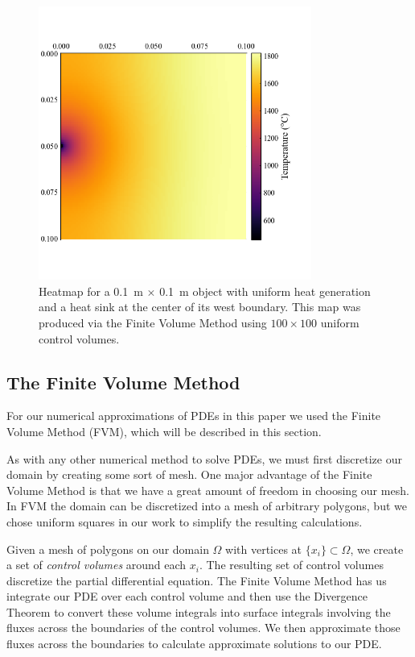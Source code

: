 \begin{figure}
	\centering
	\includegraphics[width=0.8\textwidth]{Chapter_I_Background/Images/Heatmap_Example.png}
	\caption[Heatmap Example]{Heatmap for a \SI{0.1}{\meter} $\times$ \SI{0.1}{\meter} object with uniform heat generation and a heat sink at the center of its west boundary. This map was produced via the Finite Volume Method using $100\times 100$ uniform control volumes.}
	\label{fig:heatmap-example}
\end{figure}

\subsection{The Finite Volume Method}

For our numerical approximations of PDEs in this paper we used the Finite Volume Method (FVM), which will be described in this section.

As with any other numerical method to solve PDEs, we must first discretize our domain by creating some sort of mesh. One major advantage of the Finite Volume Method is that we have a great amount of freedom in choosing our mesh. In FVM the domain can be discretized into a mesh of arbitrary polygons, but we chose uniform squares in our work to simplify the resulting calculations.

Given a mesh of polygons on our domain $\Omega$ with vertices at $\lbrace x_i\rbrace\subset\Omega$, we create a set of {\color{baystate}\textit{control volumes}} around each $x_i$. The resulting set of control volumes discretize the partial differential equation. The Finite Volume Method has us integrate our PDE over each control volume and then use the {\color{tiananmen}Divergence Theorem} to convert these volume integrals into surface integrals involving the fluxes across the boundaries of the control volumes. We then approximate those fluxes across the boundaries to calculate approximate solutions to our PDE.

